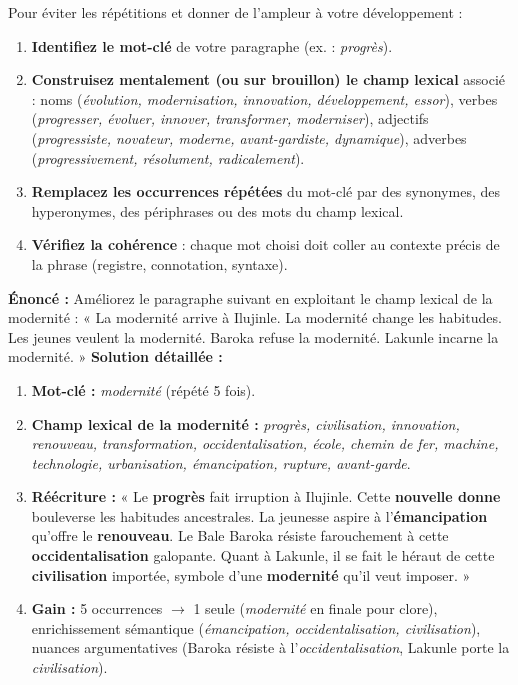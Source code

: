 \documentclass[11pt]{article}
\begin{document}
\begin{methode}
Pour éviter les répétitions et donner de l'ampleur à votre développement :
\begin{enumerate}
    \item \textbf{Identifiez le mot-clé} de votre paragraphe (ex. : \emph{progrès}).
    \item \textbf{Construisez mentalement (ou sur brouillon) le champ lexical} associé : noms (\emph{évolution, modernisation, innovation, développement, essor}), verbes (\emph{progresser, évoluer, innover, transformer, moderniser}), adjectifs (\emph{progressiste, novateur, moderne, avant-gardiste, dynamique}), adverbes (\emph{progressivement, résolument, radicalement}).
    \item \textbf{Remplacez les occurrences répétées} du mot-clé par des synonymes, des hyperonymes, des périphrases ou des mots du champ lexical.
    \item \textbf{Vérifiez la cohérence} : chaque mot choisi doit coller au contexte précis de la phrase (registre, connotation, syntaxe).
\end{enumerate}
\end{methode}

\begin{exoresolu}
\textbf{Énoncé :} Améliorez le paragraphe suivant en exploitant le champ lexical de la modernité : « La modernité arrive à Ilujinle. La modernité change les habitudes. Les jeunes veulent la modernité. Baroka refuse la modernité. Lakunle incarne la modernité. »
\tcblower
\textbf{Solution détaillée :}
\begin{enumerate}
    \item \textbf{Mot-clé :} \emph{modernité} (répété 5 fois).
    \item \textbf{Champ lexical de la modernité :} \emph{progrès, civilisation, innovation, renouveau, transformation, occidentalisation, école, chemin de fer, machine, technologie, urbanisation, émancipation, rupture, avant-garde}.
    \item \textbf{Réécriture :} « Le \textbf{progrès} fait irruption à Ilujinle. Cette \textbf{nouvelle donne} bouleverse les habitudes ancestrales. La jeunesse aspire à l'\textbf{émancipation} qu'offre le \textbf{renouveau}. Le Bale Baroka résiste farouchement à cette \textbf{occidentalisation} galopante. Quant à Lakunle, il se fait le héraut de cette \textbf{civilisation} importée, symbole d'une \textbf{modernité} qu'il veut imposer. »
    \item \textbf{Gain :} 5 occurrences $\rightarrow$ 1 seule (\emph{modernité} en finale pour clore), enrichissement sémantique (\emph{émancipation, occidentalisation, civilisation}), nuances argumentatives (Baroka résiste à l'\emph{occidentalisation}, Lakunle porte la \emph{civilisation}).
\end{enumerate}
\end{exoresolu}
\end{document}
